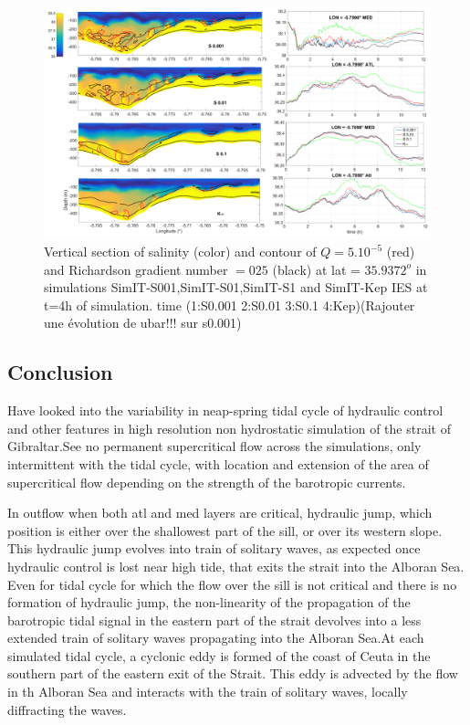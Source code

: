 \begin{figure}[!h]
 \includegraphics[width=\textwidth]{./GBR3D/Figsmago.png}
 \caption {Vertical section of salinity (color) and contour of $Q=5.10^{-5}$ (red) and Richardson gradient number $=025$ (black) at lat = $35.9372^o$ in simulations SimIT-S001,SimIT-S01,SimIT-S1 and SimIT-Kep IES at t=4h of simulation. time  (1:S0.001  2:S0.01  3:S0.1 4:Kep)(Rajouter une évolution de ubar!!! sur s0.001)}
 \label{Fig3Dsch}
\end{figure}

\subsection{Conclusion}

Have looked into the variability in neap-spring tidal cycle of hydraulic control and other features in high resolution non hydrostatic simulation of the strait of Gibraltar.See no permanent supercritical flow across the simulations, only intermittent with the tidal cycle, with location and extension of the area of supercritical flow depending on the strength of the barotropic currents.

In outflow when both atl and med layers are critical, hydraulic jump, which position is either over the shallowest part of the sill, or over its western slope. This hydraulic jump evolves into train of solitary waves, as expected once hydraulic control is lost near high tide, that exits the strait into the Alboran Sea. Even for tidal cycle for which the flow over the sill is not critical and there is no formation of hydraulic jump, the non-linearity of the propagation of the barotropic tidal signal in the eastern part of the strait devolves into a less extended train of solitary waves propagating into the Alboran Sea.At each simulated tidal cycle, a cyclonic eddy is formed of the coast of Ceuta in the southern part of the eastern exit of the Strait. This eddy is advected by the flow in th Alboran Sea and interacts with the train of solitary waves, locally diffracting the waves.


